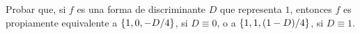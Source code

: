 \begin{ejerReducidas}\label{ejer:reducidas:representaciones:bisbis}
	Probar que, si $f$ es una forma de discriminante $D$ que
	representa $1$, entonces $f$ es propiamente equivalente a
	$\left\{1,0,-D/4\right\}$, si $D\equiv 0$, o a
	$\left\{1,1,(1-D)/4\right\}$, si $D\equiv 1$.%
\end{ejerReducidas}

